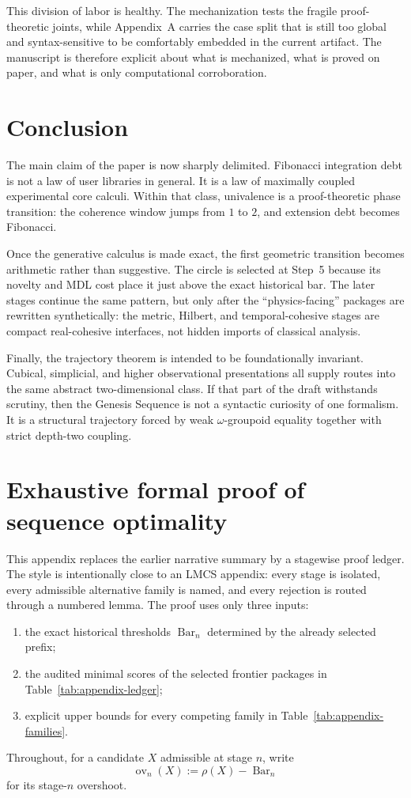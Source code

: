 \documentclass{lmcs}
\theoremstyle{plain}
\theoremstyle{definition}
\theoremstyle{remark}
\newcommand{\SelBar}{\ensuremath{\operatorname{Bar}}}
\newcommand{\ov}{\ensuremath{\operatorname{ov}}}
\begin{document}
This division of labor is healthy.
The mechanization tests the fragile proof-theoretic joints, while Appendix~A carries the case split that is still too global and syntax-sensitive to be comfortably embedded in the current artifact.
The manuscript is therefore explicit about what is mechanized, what is proved on paper, and what is only computational corroboration.

\section{Conclusion}

The main claim of the paper is now sharply delimited.
Fibonacci integration debt is not a law of user libraries in general.
It is a law of maximally coupled experimental core calculi.
Within that class, univalence is a proof-theoretic phase transition: the coherence window jumps from $1$ to $2$, and extension debt becomes Fibonacci.

Once the generative calculus is made exact, the first geometric transition becomes arithmetic rather than suggestive.
The circle is selected at Step~5 because its novelty and MDL cost place it just above the exact historical bar.
The later stages continue the same pattern, but only after the ``physics-facing'' packages are rewritten synthetically: the metric, Hilbert, and temporal-cohesive stages are compact real-cohesive interfaces, not hidden imports of classical analysis.

Finally, the trajectory theorem is intended to be foundationally invariant.
Cubical, simplicial, and higher observational presentations all supply routes into the same abstract two-dimensional class.
If that part of the draft withstands scrutiny, then the Genesis Sequence is not a syntactic curiosity of one formalism.
It is a structural trajectory forced by weak $\omega$-groupoid equality together with strict depth-two coupling.


\appendix

\section{Exhaustive formal proof of sequence optimality}
\label{app:optimality}

This appendix replaces the earlier narrative summary by a stagewise proof ledger.
The style is intentionally close to an LMCS appendix: every stage is isolated, every admissible alternative family is named, and every rejection is routed through a numbered lemma.
The proof uses only three inputs:
\begin{enumerate}[label=(\roman*),nosep]
  \item the exact historical thresholds $\SelBar_n$ determined by the already selected prefix;
  \item the audited minimal scores of the selected frontier packages in Table~\ref{tab:appendix-ledger};
  \item explicit upper bounds for every competing family in Table~\ref{tab:appendix-families}.
\end{enumerate}
Throughout, for a candidate $X$ admissible at stage $n$, write
\[
  \ov_n(X):=\rho(X)-\SelBar_n
\]
for its stage-$n$ overshoot.
\end{document}

